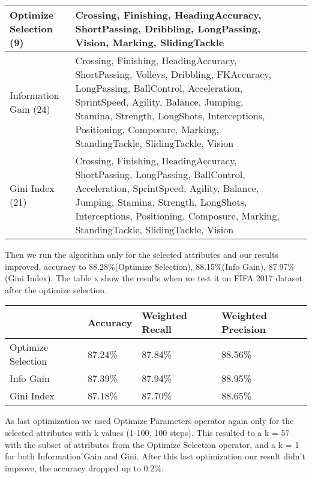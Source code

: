 \begin{tabular}{p{3.5cm}|p{7.5cm}l|l}
\hline 
Optimize Selection (9) & Crossing, Finishing, HeadingAccuracy, ShortPassing, Dribbling, LongPassing, Vision, Marking, SlidingTackle \vspace{0.5cm}\\ 
\hline 
Information Gain (24)& Crossing, Finishing, HeadingAccuracy, ShortPassing, Volleys, Dribbling, FKAccuracy, LongPassing, BallControl, Acceleration, SprintSpeed, Agility, Balance, Jumping, Stamina, Strength, LongShots, Interceptions, Positioning, Composure, Marking, StandingTackle, SlidingTackle, Vision \vspace{0.5cm}\\ 
\hline 
Gini Index (21) & Crossing, Finishing, HeadingAccuracy, ShortPassing, LongPassing, BallControl, Acceleration, SprintSpeed, Agility, Balance, Jumping, Stamina, Strength, LongShots, Interceptions, Positioning, Composure, Marking, StandingTackle, SlidingTackle, Vision
\label{tab:knn2}
\end{tabular} 

	
Then we run the algorithm only for the selected attributes and our results improved, accuracy to 88.28\%(Optimize Selection), 88.15\%(Info Gain), 87.97\%(Gini Index). The table x show the results when we test it on FIFA 2017 dataset after the optimize selection.

\begin{tabular}{l|l|l|l}
\hline 
& Accuracy & Weighted Recall& Weighted Precision \\ 
\hline 
Optimize Selection & 87.24\% & 87.84\% & 88.56\% \\ 
\hline 
Info Gain & 87.39\% & 87.94\%	& 88.95\% \\ 
\hline 
Gini Index	& 87.18\% & 87.70\% & 	88.65\%  \\ 
\hline 
\end{tabular} 





As last optimization we used Optimize Parameters operator again only for the selected attributes with k values (1-100, 100 steps). This resulted to a k = 57 with the subset of attributes from the Optimize Selection operator, and a k = 1 for both Information Gain and Gini. After this last optimization our result didn’t improve, the accuracy dropped up to 0.2\%.
%
%

